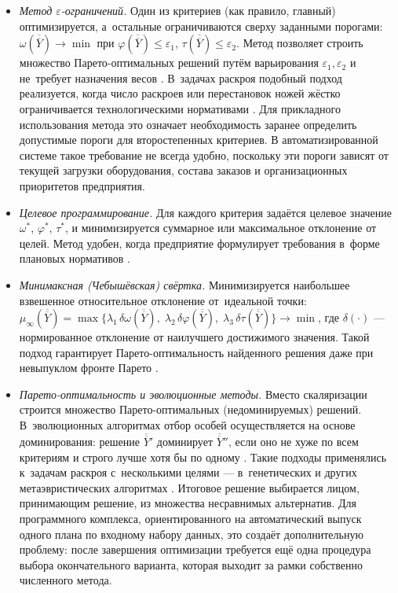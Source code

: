 \begin{itemize}
  \item \emph{Метод $\varepsilon$-ограничений.}
Один из критериев (как правило, главный) оптимизируется, а~остальные ограничиваются сверху заданными порогами:
$\omega(\overline{\overline{Y}}) \to \min$ при $\varphi(\overline{\overline{Y}}) \le \varepsilon_1$, $\tau(\overline{\overline{Y}}) \le \varepsilon_2$.
Метод позволяет строить множество Парето-оптимальных решений путём варьирования $\varepsilon_1,\varepsilon_2$ и не~требует назначения весов \cite{васильев2016методы}.
В~задачах раскроя подобный подход реализуется, когда число раскроев или перестановок ножей жёстко ограничивается технологическими нормативами \cite{mobasher2013,vanderbeck2000}. Для прикладного использования метода это означает необходимость заранее определить допустимые пороги для второстепенных критериев. В автоматизированной системе такое требование не всегда удобно, поскольку эти пороги зависят от текущей загрузки оборудования, состава заказов и организационных приоритетов предприятия.

  \item \emph{Целевое программирование.}
Для каждого критерия задаётся целевое значение $\omega^*$, $\varphi^*$, $\tau^*$, и минимизируется суммарное или максимальное отклонение от целей.
Метод удобен, когда предприятие формулирует требования в~форме плановых нормативов \cite{зенков2017методы}.

  \item \emph{Минимаксная (Чебышёвская) свёртка.}
Минимизируется наибольшее взвешенное относительное отклонение от~идеальной точки:
$\mu_{\infty}(\overline{\overline{Y}}) = \max\!\bigl\{\lambda_1\,\delta\omega(\overline{\overline{Y}}),\;\lambda_2\,\delta\varphi(\overline{\overline{Y}}),\;\lambda_3\,\delta\tau(\overline{\overline{Y}})\bigr\} \to \min$,
где $\delta(\cdot)$ — нормированное отклонение от наилучшего достижимого значения.
Такой подход гарантирует Парето-оптимальность найденного решения даже при невыпуклом фронте Парето \cite{васильев2016методы,струченков2017методы}.

  \item \emph{Парето-оптимальность и эволюционные методы.}
 Вместо скаляризации строится множество Парето-оптимальных (недоминируемых) решений.
 В~эволюционных алгоритмах отбор особей осуществляется на основе доминирования: решение $\overline{\overline{Y}}'$ доминирует $\overline{\overline{Y}}''$, если оно не хуже по всем критериям и строго лучше хотя бы по одному \cite{goldberg1989genetic,gladkov2010, deb2001_moo_ea, eiben2015_intro_ec}.
 Такие подходы применялись к~задачам раскроя с~несколькими целями — в~генетических \cite{golfeto2009genetic,sugianto2022rebar} и других метаэвристических алгоритмах \cite{lai1997developing}.
 Итоговое решение выбирается лицом, принимающим решение, из множества несравнимых альтернатив. Для программного комплекса, ориентированного на автоматический выпуск одного плана по входному набору данных, это создаёт дополнительную проблему: после завершения оптимизации требуется ещё одна процедура выбора окончательного варианта, которая выходит за рамки собственно численного метода.
\end{itemize}


